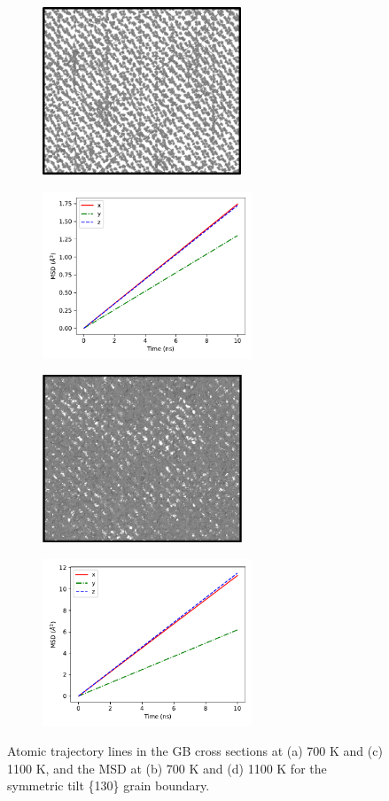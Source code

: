\documentclass{elsarticle}
\begin{document}
\begin{figure}[!ht]
\centering
	\begin{subfigure}{0.49\textwidth}
		\centering
		\caption{}
		\includegraphics[height=5cm]{130at700cs.png}
	\end{subfigure}
	\begin{subfigure}{0.49\textwidth}
		\centering
		\caption{}
		\includegraphics[height=5cm]{130at700xyz.pdf}
	\end{subfigure}
    \par\medskip
	\begin{subfigure}{0.49\textwidth}
		\centering
		\caption{}
		\includegraphics[height=5cm]{130at1100cs.png}
	\end{subfigure}
	\begin{subfigure}{0.49\textwidth}
		\centering
		\caption{}
		\includegraphics[height=5cm]{130at1100xyz.pdf}
	\end{subfigure}
\caption{Atomic trajectory lines in the GB cross sections at (a) 700 K and (c) 1100 K, and the MSD at (b) 700 K and (d) 1100 K for the symmetric tilt \{130\} grain boundary.}
\label{fig:130}
\end{figure}
\end{document}

